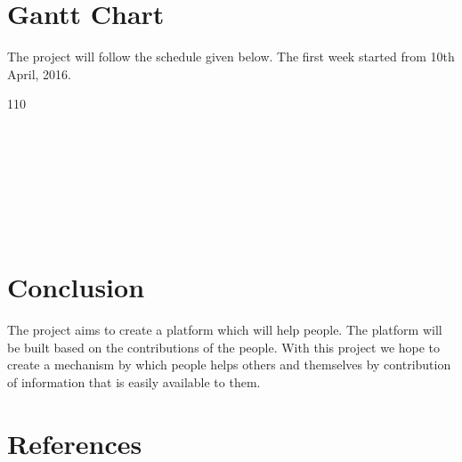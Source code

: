 \documentclass[12ptpt,a4paper]{article}
\begin{document}
	\section{Gantt Chart}
	The project will follow the schedule given below. The first week started from 10th April, 2016.

	\begin{ganttchart}[hgrid,
		vgrid,
		x unit =1 cm,
		bar/.append style={fill=gray}		
		]{1}{10}
		 \\
		 \\
		 \\
		 \\
		 \\
		 \\
		 \\
		 \\
	\end{ganttchart}
	\break
	\newpage	
	\section{Conclusion}
	The project aims to create a platform which will help people. The platform will be built based on the contributions of the people. With this project we hope to create a mechanism by which people helps others and themselves by contribution of information that is easily available to them.
	\newpage
	\section{References}
	\printbibliography[heading=none]
\end{document}
